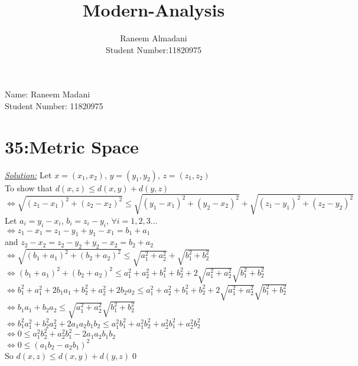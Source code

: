 \documentclass[12pt]{article}
\title{\Huge{Modern-Analysis}}
\author{\Large{Raneem Almadani\\ Student Number:11820975}}
\begin{document}
{\Large Name: Raneem Madani\\
Student Number: 11820975}
\section*{35:Metric Space}
\begin{center} 
\end{center}
{\color{red}\textit{\underline{Solution:}}} Let $x=(x_1,x_2)$, $y=(y_1,y_2)$, $z=(z_1,z_2)$\\
To show that $d(x,z) \leq d(x,y)+d(y,z)$
$$\Leftrightarrow \sqrt{(z_1-x_1)^2+(z_2-x_2)^2} \leq
\sqrt{(y_1-x_1)^2+(y_2-x_2)^2}+\sqrt{(z_1-y_1)^2+(z_2-y_2)^2}$$
Let $a_i=y_i-x_i$,  $b_i=z_i-y_i$, $\forall i=1,2,3...$\\
$\Leftrightarrow z_1-x_1=z_1-y_1+y_1-x_1=b_1+a_1$\\
and $z_2-x_2=z_2-y_2+y_2-x_2=b_2+a_2$\\
$\Leftrightarrow \sqrt{(b_1+a_1)^2+(b_2+a_2)^2}\leq \sqrt{a_1^2+a_2^2}+\sqrt{b_1^2+b_2^2}$ \\
$\Leftrightarrow (b_1+a_1)^2+(b_2+a_2)^2\leq a_1^2+a_2^2+b_1^2+b_2^2+2\sqrt{a_1^2+a_2^2}\sqrt{b_1^2+b_2^2}$\\
$\Leftrightarrow b_1^2+a_1^2+2b_1a_1+b_2^2+a_2^2+2b_2a_2 \leq a_1^2+a_2^2+b_1^2+b_2^2+2\sqrt{a_1^2+a_2^2}\sqrt{b_1^2+b_2^2}$\\
$\Leftrightarrow b_1a_1+b_2a_2\leq \sqrt{a_1^2+a_2^2}\sqrt{b_1^2+b_2^2}$ 
\\
$\Leftrightarrow b_1^2a_1^2+b_2^2a_2^2+2a_1a_2b_1b_2 \leq a_1^2b_1^2+a_1^2b_2^2+a_2^2b_1^2+a_2^2b_2^2$\\
$\Leftrightarrow 0\leq a_1^2b_2^2+a_2^2b_1^2-2a_1a_2b_1b_2$\\
$\Leftrightarrow 0\leq (a_1b_2-a_2b_1)^2$\\
{\color{red}So $d(x,z)\leq d(x,y)+d(y,z)$}\qed
\newpage
\end{document}

